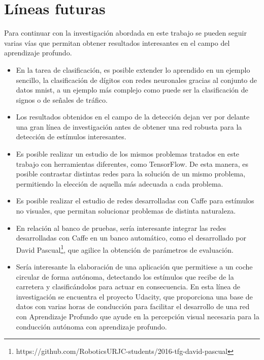 \section{Líneas futuras}
Para continuar con la investigación abordada en este trabajo se pueden seguir varias vías que permitan obtener resultados interesantes en el campo del aprendizaje profundo.
\begin{itemize}
	\item En la tarea de clasificación, es posible extender lo aprendido en un ejemplo sencillo, la clasificación de dígitos con redes neuronales gracias al conjunto de datos \acrshort{mnist}, a un ejemplo más complejo como puede ser la clasificación de signos o de señales de tráfico.
	\item Los resultados obtenidos en el campo de la detección dejan ver por delante una gran línea de investigación antes de obtener una red robusta para la detección de estímulos interesantes.
	\item Es posible realizar un estudio de los mismos problemas tratados en este trabajo con herramientas diferentes, como TensorFlow. De esta manera, es posible contrastar distintas redes para la solución de un mismo problema, permitiendo la elección de aquella más adecuada a cada problema.
	\item Es posible realizar el estudio de redes desarrolladas con Caffe para estímulos no visuales, que permitan solucionar problemas de distinta naturaleza.
	\item En relación al banco de pruebas, sería interesante integrar las redes desarrolladas con Caffe en un banco automático, como el desarrollado por David Pascual\footnote{https://github.com/RoboticsURJC-students/2016-tfg-david-pascual}, que agilice la obtención de parámetros de evaluación.
	\item Sería interesante la elaboración de una aplicación que permitiese a un coche circular de forma autónoma, detectando los estímulos que recibe de la carretera y clasificándolos para actuar en consecuencia. En esta línea de investigación se encuentra el proyecto Udacity, que proporciona una base de datos con varias horas de conducción para facilitar el desarrollo de una red con Aprendizaje Profundo que ayude en la percepción visual necesaria para la conducción autónoma con aprendizaje profundo. 
\end{itemize}

